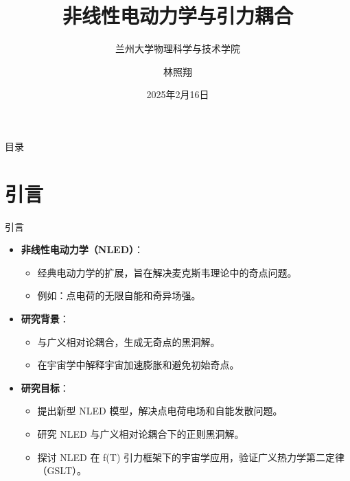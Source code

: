 \documentclass{beamer}
\title{非线性电动力学与引力耦合}
\subtitle{兰州大学物理科学与技术学院}
\author{林照翔}
\date{2025年2月16日}
\begin{document}
\begin{frame}
\titlepage
\end{frame}

\begin{frame}{目录}
\tableofcontents
\end{frame}

\section{引言}
\begin{frame}{引言}
\begin{itemize}
    \item \textbf{非线性电动力学（NLED）}：
    \begin{itemize}
        \item 经典电动力学的扩展，旨在解决麦克斯韦理论中的奇点问题。
        \item 例如：点电荷的无限自能和奇异场强。
    \end{itemize}
    \item \textbf{研究背景}：
    \begin{itemize}
        \item 与广义相对论耦合，生成无奇点的黑洞解。
        \item 在宇宙学中解释宇宙加速膨胀和避免初始奇点。
    \end{itemize}
    \item \textbf{研究目标}：
    \begin{itemize}
        \item 提出新型 NLED 模型，解决点电荷电场和自能发散问题。
        \item 研究 NLED 与广义相对论耦合下的正则黑洞解。
        \item 探讨 NLED 在 f(T) 引力框架下的宇宙学应用，验证广义热力学第二定律（GSLT）。
    \end{itemize}
\end{itemize}
\end{frame}
\end{document}
